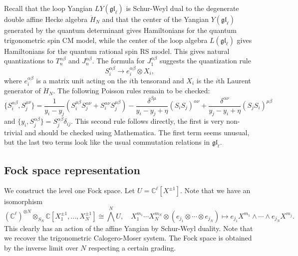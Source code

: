 \documentclass[11pt]{report}
\theoremstyle{definition}
\theoremstyle{remark}
\theoremstyle{remark}
\newcommand{\C}{\mathbb{C}}
\begin{document}
Recall that the loop Yangian $LY(\mathfrak{gl}_\ell)$ is Schur-Weyl dual to the degenerate double affine Hecke algebra $\ddot H_N$ and that the center of the Yangian $Y(\mathfrak{gl}_\ell)$ generated by the quantum determinant gives Hamiltonians for the quantum trigonometric spin CM model, while the center of the loop algebra $L(\mathfrak{gl}_\ell)$ gives Hamiltonians for the quantum rational spin RS model. This gives natural quantizations to $T_n^{\alpha\beta}$ and $J_n^{\alpha\beta}$. The formula for $J_1^{\alpha\beta}$ suggests the quantization rule
\begin{equation*}
S_i^{\alpha\beta} \to e_i^{\alpha\beta} \otimes X_i,
\end{equation*}
where $e_i^{\alpha\beta}$ is a matrix unit acting on the $i$th tensorand and $X_i$ is the $i$th Laurent generator of $\ddot H_N$. The following Poisson rules remain to be checked:
\begin{equation*}
\{ S_i^{\alpha\beta},S_j^{\mu\nu} \} = \frac{1}{y_i-y_j} (S_i^{\mu\beta} S_j^{\alpha\nu} + S_i^{\alpha\nu} S_j^{\mu\beta}) - \frac{\delta^{\beta\mu}}{y_i-y_j+\eta} (S_iS_j)^{\alpha\nu} + \frac{\delta^{\alpha\nu}}{y_j-y_i+\eta} (S_jS_i)^{\mu\beta} 
\end{equation*}
and $\{ y_i, S_j^{\alpha\beta} \} = S_j^{\alpha\beta} \delta_{ij}$. This second rule follows directly, the first is very non-trivial and should be checked using Mathematica. The first term seems unusual, but the last two terms look like the usual commutation relations in $\mathfrak{gl}_\ell$.

\subsection{Fock space representation}

\cite{article:kodera:2016}

We construct the level one Fock space. Let $U = \C^\ell[X^{\pm 1}]$. Note that we have an isomorphism
\begin{equation*}
(\C^\ell)^{\otimes N} \otimes_{S_N} \C[X_1^{\pm 1},...,X_N^{\pm 1}] \cong \bigwedge^N U, \quad X_1^{m_1} \cdots X_N^{m_N} \otimes (e_{j_1} \otimes \cdots \otimes e_{j_N}) \mapsto e_{j_1} X^{m_1} \wedge \cdots \wedge e_{j_N} X^{m_j}.
\end{equation*}
This clearly has an action of the affine Yangian by Schur-Weyl duality. Note that we recover the trigonometric Calogero-Moser system. The Fock space is obtained by the inverse limit over $N$ respecting a certain grading.
\end{document}
